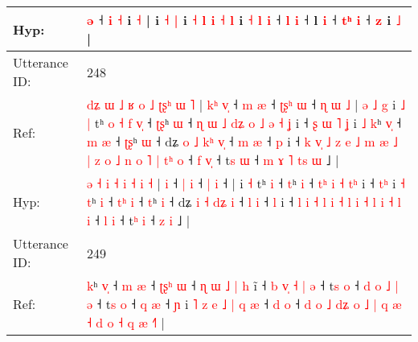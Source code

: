\documentclass[10pt]{article}
\DeclareRobustCommand{\hl}[1]{{\textcolor{red}{#1}}}
\begin{document}
\begin{longtable}{ll}
 \\
Hyp: & \hl{ə} ˧\hl{}\hl{}\hl{}\hl{}\hl{}\hl{}\hl{}\hl{}\hl{}\hl{}\hl{}\hl{}\hl{}\hl{}\hl{}\hl{}\hl{} \hl{i} \hl{˧} i \hl{˧} |\hl{}\hl{}\hl{} i \hl{˧} \hl{}\hl{|} i \hl{˧} \hl{}\hl{l} \hl{i} \hl{˧} \hl{l} i\hl{}\hl{}\hl{}\hl{} \hl{˧} \hl{l} \hl{i} ˧ \hl{l} \hl{i} ˧\hl{}\hl{}\hl{} l \hl{i} ˧ \hl{t}\hl{ʰ} \hl{i} ˧ \hl{z} i \hl{˩} |
 \\
\midrule
Utterance ID: & 248 \\
Ref: & \hl{d}\hl{ʑ}\hl{ }\hl{ɯ} \hl{˩} \hl{ʁ} \hl{o} \hl{˩} \hl{ʈ}\hl{ʂ}\hl{ʰ} \hl{ɯ} \hl{˥} |\hl{ }\hl{k}\hl{ʰ} \hl{v}\hl{̩} ˧ \hl{m} \hl{æ} ˧ \hl{ʈ}\hl{ʂ}\hl{ʰ} \hl{ɯ} ˧\hl{ }\hl{ɳ}\hl{ }\hl{ɯ}\hl{ }\hl{˩} |\hl{ }\hl{ə}\hl{ }\hl{˩}\hl{ }\hl{g} i\hl{ }\hl{˩} \hl{|} tʰ\hl{ }\hl{o}\hl{ }\hl{˧}\hl{ }\hl{f} \hl{v}\hl{̩} ˧ \hl{ʈ}\hl{ʂ}ʰ \hl{ɯ} ˧\hl{ }\hl{ɳ}\hl{ }\hl{ɯ}\hl{ }\hl{˩} \hl{d}\hl{ʑ}\hl{ }\hl{o} \hl{˩} \hl{ə} \hl{˧}\hl{ }\hl{ʝ} i ˧\hl{ }\hl{ʂ}\hl{ }\hl{ɯ} \hl{˥}\hl{ }\hl{ʝ} i \hl{˩} \hl{k}ʰ \hl{v}\hl{̩} ˧ \hl{}\hl{m} \hl{æ} ˧ \hl{ʈ}\hl{ʂ}ʰ \hl{ɯ} ˧ dʑ \hl{o} \hl{˩} \hl{k}\hl{ʰ} \hl{v}\hl{̩} ˧ \hl{m} \hl{æ} ˧ \hl{p} i ˧\hl{ }\hl{k}\hl{ }\hl{v}\hl{̩}\hl{ }\hl{˩}\hl{ }\hl{z}\hl{ }\hl{e} \hl{˩} \hl{m} \hl{æ} \hl{˩} \hl{|} \hl{z} \hl{o} \hl{˩} \hl{n} \hl{o} \hl{˥} \hl{|} \hl{t}\hl{ʰ} \hl{o} ˧ \hl{f} \hl{v}\hl{̩} ˧ t\hl{s} \hl{ɯ} ˧\hl{ }\hl{m}\hl{ }\hl{ɤ}\hl{ }\hl{˥} \hl{t}\hl{s} \hl{ɯ} ˩ |
 \\
Hyp: & \hl{}\hl{}\hl{}\hl{ə} \hl{˧} \hl{i} \hl{˧} \hl{i} \hl{}\hl{}\hl{˧} \hl{i} \hl{˧} |\hl{}\hl{}\hl{} \hl{}\hl{i} ˧ \hl{|} \hl{i} ˧ \hl{}\hl{}\hl{|} \hl{i} ˧\hl{}\hl{}\hl{}\hl{}\hl{}\hl{} |\hl{}\hl{}\hl{}\hl{}\hl{}\hl{} i\hl{}\hl{} \hl{˧} tʰ\hl{}\hl{}\hl{}\hl{}\hl{}\hl{} \hl{}\hl{i} ˧ \hl{}\hl{t}ʰ \hl{i} ˧\hl{}\hl{}\hl{}\hl{}\hl{}\hl{} \hl{}\hl{}\hl{t}\hl{ʰ} \hl{i} \hl{˧} \hl{}\hl{t}\hl{ʰ} i ˧\hl{}\hl{}\hl{}\hl{} \hl{}\hl{t}\hl{ʰ} i \hl{˧} \hl{t}ʰ \hl{}\hl{i} ˧ \hl{t}\hl{ʰ} \hl{i} ˧ \hl{}\hl{t}ʰ \hl{i} ˧ dʑ \hl{i} \hl{˧} \hl{d}\hl{ʑ} \hl{}\hl{i} ˧ \hl{l} \hl{i} ˧ \hl{l} i ˧\hl{}\hl{}\hl{}\hl{}\hl{}\hl{}\hl{}\hl{}\hl{}\hl{}\hl{} \hl{l} \hl{i} \hl{˧} \hl{l} \hl{i} \hl{˧} \hl{l} \hl{i} \hl{˧} \hl{l} \hl{i} \hl{˧} \hl{}\hl{l} \hl{i} ˧ \hl{l} \hl{}\hl{i} ˧ t\hl{ʰ} \hl{i} ˧\hl{}\hl{}\hl{}\hl{}\hl{}\hl{} \hl{}\hl{z} \hl{i} ˩ |
 \\
\midrule
Utterance ID: & 249 \\
Ref: & \hl{k}ʰ\hl{ }\hl{v}\hl{̩} ˧\hl{ }\hl{m} \hl{æ} ˧\hl{ }\hl{ʈ}\hl{ʂ}\hl{ʰ} \hl{ɯ} ˧ \hl{ɳ} \hl{ɯ} \hl{˩} \hl{|}\hl{ }\hl{h} i\hl{̃} ˧\hl{ }\hl{b}\hl{ }\hl{v}\hl{̩} \hl{˧}\hl{ }\hl{|} \hl{ə} ˧ t\hl{s} \hl{o} ˧\hl{ }\hl{d}\hl{ }\hl{o} \hl{˩}\hl{ }\hl{|} \hl{ə} ˧ t\hl{s} \hl{o} ˧ \hl{q} \hl{æ} ˧ \hl{ɲ} i\hl{ }\hl{˥} \hl{z} \hl{e} \hl{˩} \hl{|} \hl{q} \hl{æ} ˧ \hl{d} \hl{o} ˧\hl{ }\hl{d}\hl{ }\hl{o} \hl{˩} \hl{d}\hl{ʑ} \hl{o} \hl{˩}\hl{ }\hl{|} \hl{q} \hl{æ} \hl{˧}\hl{ }\hl{d} \hl{o} \hl{˧} \hl{q} \hl{æ} \hl{˧}\hl{˥} |

\end{longtable}
\end{document}

